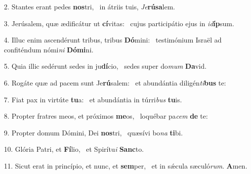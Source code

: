 2. Stantes erant pedes \textbf{nos}tri, \ast\  in átriis tuis, \textit{Je}\textbf{rú}\textbf{sa}lem.\

3. Jerúsalem, quæ ædificátur ut \textbf{cí}vitas: \ast\  cujus participátio ejus in \textit{id}\textbf{íp}sum.\

4. Illuc enim ascendérunt tribus, tribus \textbf{Dó}mini: \ast\  testimónium Israël ad confiténdum nómi\textit{ni} \textbf{Dó}\textbf{mi}ni.\

5. Quia illic sedérunt sedes in ju\textbf{dí}cio, \ast\  sedes super do\textit{mum} \textbf{Da}vid.\

6. Rogáte quæ ad pacem sunt Je\textbf{rú}salem: \ast\  et abundántia diligén\textit{ti}\textbf{bus} te:\

7. Fiat pax in virtúte \textbf{tu}a: \ast\  et abundántia in túrri\textit{bus} \textbf{tu}is.\

8. Propter fratres meos, et próximos \textbf{me}os, \ast\  loquébar pa\textit{cem} \textbf{de} te:\

9. Propter domum Dómini, Dei \textbf{nos}tri, \ast\  quæsívi bo\textit{na} \textbf{ti}bi.\

10. Glória Patri, et \textbf{Fí}lio, \ast\  et Spirítu\textit{i} \textbf{Sanc}to.\

11. Sicut erat in princípio, et nunc, et \textbf{sem}per, \ast\  et in sǽcula sæculó\textit{rum}. \textbf{A}men.\

